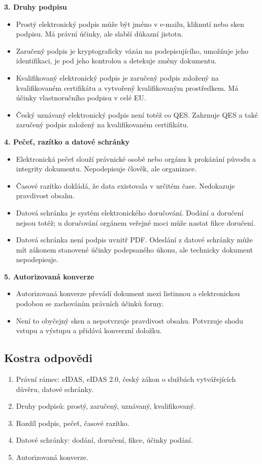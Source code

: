 \documentclass[11pt,a4paper]{article}
\begin{document}
\textbf{3. Druhy podpisu}
\begin{itemize}
  \item Prostý elektronický podpis může být jméno v e-mailu, kliknutí nebo sken podpisu. Má právní účinky, ale slabší důkazní jistotu.
  \item Zaručený podpis je kryptograficky vázán na podepisujícího, umožňuje jeho identifikaci, je pod jeho kontrolou a detekuje změny dokumentu.
  \item Kvalifikovaný elektronický podpis je zaručený podpis založený na kvalifikovaném certifikátu a vytvořený kvalifikovaným prostředkem. Má účinky vlastnoručního podpisu v celé EU.
  \item Český uznávaný elektronický podpis není totéž co QES. Zahrnuje QES a také zaručený podpis založený na kvalifikovaném certifikátu.
\end{itemize}

\textbf{4. Pečeť, razítko a datové schránky}
\begin{itemize}
  \item Elektronická pečeť slouží právnické osobě nebo orgánu k prokázání původu a integrity dokumentu. Nepodepisuje člověk, ale organizace.
  \item Časové razítko dokládá, že data existovala v určitém čase. Nedokazuje pravdivost obsahu.
  \item Datová schránka je systém elektronického doručování. Dodání a doručení nejsou totéž; u doručování orgánem veřejné moci může nastat fikce doručení.
  \item Datová schránka není podpis uvnitř PDF. Odeslání z datové schránky může mít zákonem stanovené účinky podepsaného úkonu, ale technicky dokument nepodepisuje.
\end{itemize}

\textbf{5. Autorizovaná konverze}
\begin{itemize}
  \item Autorizovaná konverze převádí dokument mezi listinnou a elektronickou podobou se zachováním právních účinků formy.
  \item Není to obyčejný sken a nepotvrzuje pravdivost obsahu. Potvrzuje shodu vstupu a výstupu a přidává konverzní doložku.
\end{itemize}

\subsection*{Kostra odpovědi}
\begin{enumerate}
  \item Právní rámec: eIDAS, eIDAS 2.0, český zákon o službách vytvářejících důvěru, datové schránky.
  \item Druhy podpisů: prostý, zaručený, uznávaný, kvalifikovaný.
  \item Rozdíl podpis, pečeť, časové razítko.
  \item Datové schránky: dodání, doručení, fikce, účinky podání.
  \item Autorizovaná konverze.
\end{enumerate}
\end{document}
